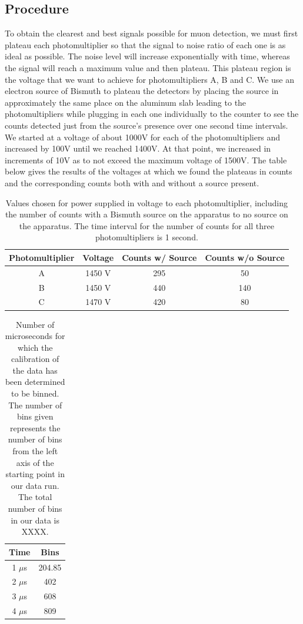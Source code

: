 \subsection{Procedure}
\indent \indent To obtain the clearest and best signals possible for muon detection, we must first plateau each photomultiplier so that the signal to noise ratio of each one is as ideal as possible. The noise level will increase exponentially with time, whereas the signal will reach a maximum value and then plateau. This plateau region is the voltage that we want to achieve for photomultipliers A, B and C. We use an electron source of Bismuth to plateau the detectors by placing the source in approximately the same place on the aluminum slab leading to the photomultipliers while plugging in each one individually to the counter to see the counts detected just from the source's presence over one second time intervals. We started at a voltage of about 1000V for each of the photomultipliers and increased by 100V until we reached 1400V. At that point, we increased in increments of 10V as to not exceed the maximum voltage of 1500V. The table below gives the results of the voltages at which we found the plateaus in counts and the corresponding counts both with and without a source present. 
\begin{table}[h]
\begin{center}
\begin{tabular}{|c|c|c|c|} \hline
Photomultiplier & Voltage & Counts w/ Source & Counts w/o Source \\ \hline
A & 1450 V & 295 & 50 \\ \hline
B & 1450 V & 440 & 140 \\ \hline
C & 1470 V & 420 & 80\\ \hline

\end{tabular}
\caption{Values chosen for power supplied in voltage to each photomultiplier, including the number of counts with a Bismuth source on the apparatus to no source on the apparatus. The time interval for the number of counts for all three photomultipliers is 1 second.}
\end{center}
\end{table}

\begin{table}[h]
\begin{center}
\begin{tabular}{|c|c|}\hline
Time & Bins\\ \hline
1 $\mu$s & 204.85\\ \hline
2 $\mu$s & 402 \\ \hline
3 $\mu$s & 608 \\ \hline
4 $\mu$s & 809 \\ \hline
\end{tabular}
\caption{Number of microseconds for which the calibration of the data has been determined to be binned. The number of bins given represents the number of bins from the left axis of the starting point in our data run. The total number of bins in our data is XXXX.}
\end{center}
\end{table}

